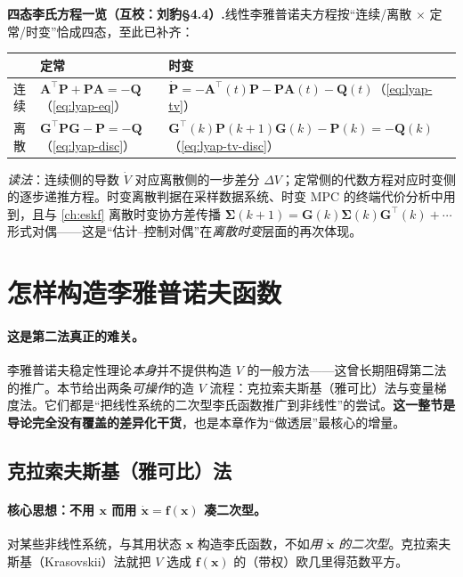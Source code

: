 \begin{note}
\textbf{四态李氏方程一览（互校：刘豹§4.4）.}\;线性李雅普诺夫方程按“连续/离散 $\times$ 定常/时变”恰成四态，至此已补齐：
\begin{center}\small
\begin{tabular}{lll}
\toprule
 & 定常 & 时变 \\
\midrule
连续 & $\mathbf{A}^\top\mathbf{P}+\mathbf{P}\mathbf{A}=-\mathbf{Q}$（\cref{eq:lyap-eq}） & $\dot{\mathbf{P}}=-\mathbf{A}^\top(t)\mathbf{P}-\mathbf{P}\mathbf{A}(t)-\mathbf{Q}(t)$（\cref{eq:lyap-tv}） \\
离散 & $\mathbf{G}^\top\mathbf{P}\mathbf{G}-\mathbf{P}=-\mathbf{Q}$（\cref{eq:lyap-disc}） & $\mathbf{G}^\top(k)\mathbf{P}(k{+}1)\mathbf{G}(k)-\mathbf{P}(k)=-\mathbf{Q}(k)$（\cref{eq:lyap-tv-disc}） \\
\bottomrule
\end{tabular}
\end{center}
\emph{读法}：连续侧的导数 $\dot V$ 对应离散侧的一步差分 $\Delta V$；定常侧的代数方程对应时变侧的逐步递推方程。时变离散判据在采样数据系统、时变 MPC 的终端代价分析中用到，且与 \cref{ch:eskf} 离散时变协方差传播 $\boldsymbol\Sigma(k{+}1)=\mathbf{G}(k)\boldsymbol\Sigma(k)\mathbf{G}^\top(k)+\cdots$ 形式对偶——这是“估计--控制对偶”在\emph{离散时变}层面的再次体现。
\end{note}

\section{怎样构造李雅普诺夫函数}
\label{sec:lyap-construct}

\paragraph{这是第二法真正的难关。}
李雅普诺夫稳定性理论\emph{本身}并不提供构造 $V$ 的一般方法——这曾长期阻碍第二法的推广。本节给出两条\emph{可操作}的造 $V$ 流程：克拉索夫斯基（雅可比）法与变量梯度法。它们都是“把线性系统的二次型李氏函数推广到非线性”的尝试。\textbf{这一整节是导论完全没有覆盖的差异化干货}，也是本章作为“做透层”最核心的增量。

\subsection{克拉索夫斯基（雅可比）法}
\label{sec:lyap-krasovskii}

\paragraph{核心思想：不用 $\mathbf{x}$ 而用 $\dot{\mathbf{x}}=\mathbf{f}(\mathbf{x})$ 凑二次型。}
对某些非线性系统，与其用状态 $\mathbf{x}$ 构造李氏函数，不如\emph{用 $\dot{\mathbf{x}}$ 的二次型}。克拉索夫斯基（Krasovskii）法就把 $V$ 选成 $\mathbf{f}(\mathbf{x})$ 的（带权）欧几里得范数平方\cite{slotine1991applied}。

